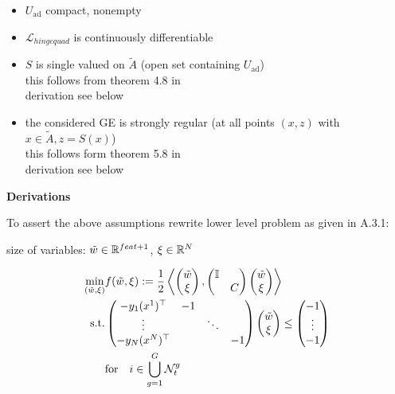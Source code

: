 \begin{itemize}
	\item \(U_{\text{ad}}\) compact, nonempty \checkmark
	\item \(\mathcal{L}_{hingequad}\) is continuously differentiable \checkmark
	\item \(S\) is single valued on \(\tilde{A}\) (open set containing \(U_{\text{ad}}\)) \\
	this follows from theorem 4.8 in \cite[p. 82]{Outrata1998} \checkmark \\
	derivation see below
	\item the considered GE is strongly regular (at all points \((x,z)\) with \(x \in \tilde{A}, z = S(x)\))\\
	this follows form theorem 5.8 in \cite[p. 96]{Outrata1998} \checkmark \\
	derivation see below
\end{itemize}

\textbf{Derivations}

To assert the above assumptions rewrite lower level problem as given in A.3.1:

size of variables: \(\tilde{w} \in \mathbb{R}^{feat+1}\), \(\xi \in \mathbb{R}^N\)

\begin{equation}
\begin{split}
	\min_{(\tilde{w},\xi)} & f(\tilde{w},\xi) :=\frac{1}{2} \left\langle \begin{pmatrix}\tilde{w} \\ \xi \end{pmatrix}, \begin{pmatrix} \mathbb{I}\\ & C \end{pmatrix} \begin{pmatrix}	\tilde{w}\\ \xi \end{pmatrix} \right\rangle \\
	\text{s.t.} & \begin{pmatrix}-y_1(x^1)^{\top} & -1 \\
		\vdots & & \ddots \\ -y_N(x^N)^{\top} & & & -1\end{pmatrix}  \begin{pmatrix}	\tilde{w}\\ \xi\end{pmatrix} \leq \begin{pmatrix}	-1\\\vdots\\-1\end{pmatrix}\\
	& \text{for} \quad i \in \bigcup_{g=1}^G \mathcal{N}_t^g
\end{split}
\label{ll_equilib}
\end{equation}

